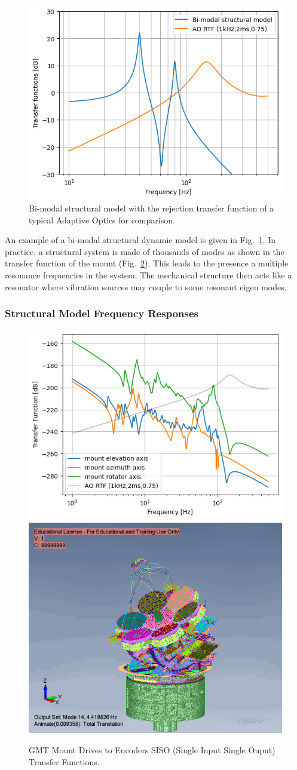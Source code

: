 \documentclass[]{AO4ELT}  %
\begin{document}
\begin{figure}
   \centering
   \includegraphics[width=0.5\linewidth]{./figures/bi-modal_sm.png}
   \caption{Bi-modal structural model with the rejection transfer function of a typical Adaptive Optics for comparison.}
   \label{fig:90}
\end{figure}

An example of a bi-modal structural dynamic model is given in Fig.~\ref{fig:90}.
In practice, a structural system is made of thousands of modes as shown in the transfer function of the mount (Fig.~\ref{fig:9}).
This leads to the presence a multiple resonance frequencies in the system.
The mechanical structure then acts like a resonator where vibration sources may couple to some resonant eigen modes.

\subsubsection{Structural Model Frequency Responses}
\label{sec:fem-frequency}

\begin{figure}
   \centering
   \includegraphics[width=0.495\linewidth]{./figures/mount-axis-tfs.png}
   \includegraphics[width=0.4\linewidth]{./figures/fem-mode-9.png}
   \caption{GMT Mount Drives to Encoders SISO (Single Input Single Ouput) Transfer Functions.}
   \label{fig:9}
\end{figure}
\end{document}
